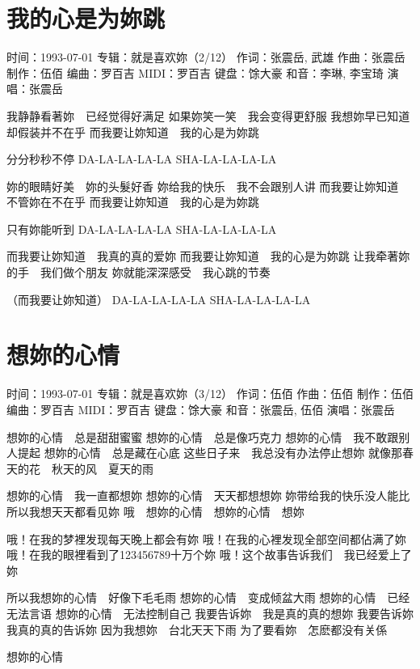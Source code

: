 \documentclass[UTF8,a4paper,oneside,twocolumn,12pt]{ctexbook}
\newcommand{\infopair}[2]{\textbullet #1：#2}
\newcommand{\zc}[1][伍佰]{\infopair{作词}{#1}}
\newcommand{\zq}[1][伍佰]{\infopair{作曲}{#1}}
\newcommand{\bq}[1][伍佰]{\infopair{编曲}{#1}}
\newcommand{\zj}[1]{\infopair{专辑}{#1}}
\newcommand{\zz}[1]{\infopair{制作}{#1}}
\newcommand{\sj}[1]{\infopair{时间}{#1}}
\newenvironment{info}{\begin{flushleft}\kaishu
	}
	{\end{flushleft}\normalsize\yahei\par}
\newenvironment{lyric}{
	}
{}
\begin{document}
\section{我的心是为妳跳}
\begin{info}
	\sj{1993-07-01}
	\zj{就是喜欢妳（2/12）}
	\zc[张震岳, 武雄]
	\zq[张震岳]
	\zz{伍佰}
	\bq[罗百吉]
	\infopair{MIDI}{罗百吉}
	\infopair{键盘}{馀大豪}
	\infopair{和音}{李琳, 李宝琦}
	\infopair{演唱}{张震岳}
\end{info}
\begin{lyric}
	我静静看著妳　已经觉得好满足
	如果妳笑一笑　我会变得更舒服
	我想妳早已知道　却假装并不在乎
	而我要让妳知道　我的心是为妳跳

	分分秒秒不停 DA-LA-LA-LA-LA SHA-LA-LA-LA-LA

	妳的眼睛好美　妳的头髮好香
	妳给我的快乐　我不会跟别人讲
	而我要让妳知道　不管妳在不在乎
	而我要让妳知道　我的心是为妳跳

	只有妳能听到 DA-LA-LA-LA-LA SHA-LA-LA-LA-LA

	而我要让妳知道　我真的真的爱妳
	而我要让妳知道　我的心是为妳跳
	让我牵著妳的手　我们做个朋友
	妳就能深深感受　我心跳的节奏

	（而我要让妳知道） DA-LA-LA-LA-LA SHA-LA-LA-LA-LA
\end{lyric}

\section{想妳的心情}
\begin{info}
	\sj{1993-07-01}
	\zj{就是喜欢妳（3/12）}
	\zc
	\zq
	\zz{伍佰}
	\bq[罗百吉]
	\infopair{MIDI}{罗百吉}
	\infopair{键盘}{馀大豪}
	\infopair{和音}{张震岳, 伍佰}
	\infopair{演唱}{张震岳}
\end{info}
\begin{lyric}
	想妳的心情　总是甜甜蜜蜜
	想妳的心情　总是像巧克力
	想妳的心情　我不敢跟别人提起
	想妳的心情　总是藏在心底
	这些日子来　我总没有办法停止想妳
	就像那春天的花　秋天的风　夏天的雨

	想妳的心情　我一直都想妳
	想妳的心情　天天都想想妳
	妳带给我的快乐没人能比
	所以我想天天都看见妳
	哦　想妳的心情　想妳的心情　想妳

	哦！在我的梦裡发现每天晚上都会有妳
	哦！在我的心裡发现全部空间都佔满了妳
	哦！在我的眼裡看到了123456789十万个妳
	哦！这个故事告诉我们　我已经爱上了妳

	所以我想妳的心情　好像下毛毛雨
	想妳的心情　变成倾盆大雨
	想妳的心情　已经无法言语
	想妳的心情　无法控制自己
	我要告诉妳　我是真的真的想妳
	我要告诉妳　我真的真的告诉妳
	因为我想妳　台北天天下雨
	为了要看妳　怎麽都没有关係

	想妳的心情
\end{lyric}
\end{document}
